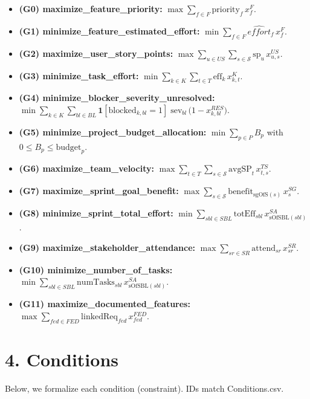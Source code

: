 \documentclass[11pt,a4paper]{article}
\begin{document}
\begin{itemize}
  \item \textbf{(G0) maximize\_feature\_priority:} \quad
  $\max \displaystyle \sum_{f \in F} \text{priority}_f \, x^{F}_{f}$.
  \item \textbf{(G1) minimize\_feature\_estimated\_effort:} \quad
  $\min \displaystyle \sum_{f \in F} \widehat{effort}_f \, x^{F}_{f}$.
  \item \textbf{(G2) maximize\_user\_story\_points:} \quad
  $\max \displaystyle \sum_{u \in US}\sum_{s \in \mathcal{S}} \text{sp}_u \, x^{US}_{u,s}$.
  \item \textbf{(G3) minimize\_task\_effort:} \quad
  $\min \displaystyle \sum_{k \in K}\sum_{t \in T} \text{eff}_k \, x^{K}_{k,t}$.
  \item \textbf{(G4) minimize\_blocker\_severity\_unresolved:} \quad
  $\min \displaystyle \sum_{k \in K}\sum_{bl \in BL} \mathbf{1}[\text{blocked}_{k,bl}{=}1] \; \text{sev}_{bl}\, \bigl(1 - x^{RES}_{k,bl}\bigr)$.
  \item \textbf{(G5) minimize\_project\_budget\_allocation:} \quad
  $\min \displaystyle \sum_{p \in P} B_p$ \quad with $0 \le B_p \le \text{budget}_p$.
  \item \textbf{(G6) maximize\_team\_velocity:} \quad
  $\max \displaystyle \sum_{t \in T}\sum_{s \in \mathcal{S}} \text{avgSP}_t \, x^{TS}_{t,s}$.
  \item \textbf{(G7) maximize\_sprint\_goal\_benefit:} \quad
  $\max \displaystyle \sum_{s \in \mathcal{S}} \text{benefit}_{\text{sgOfS}(s)} \, x^{SG}_{s}$.
  \item \textbf{(G8) minimize\_sprint\_total\_effort:} \quad
  $\min \displaystyle \sum_{sbl \in SBL} \text{totEff}_{sbl} \, x^{SA}_{\text{sOfSBL}(sbl)}$.
  \item \textbf{(G9) maximize\_stakeholder\_attendance:} \quad
  $\max \displaystyle \sum_{sr \in SR} \text{attend}_{sr} \, x^{SR}_{sr}$.
  \item \textbf{(G10) minimize\_number\_of\_tasks:} \quad
  $\min \displaystyle \sum_{sbl \in SBL} \text{numTasks}_{sbl} \, x^{SA}_{\text{sOfSBL}(sbl)}$.
  \item \textbf{(G11) maximize\_documented\_features:} \quad
  $\max \displaystyle \sum_{fed \in FED} \text{linkedReq}_{fed} \, x^{FED}_{fed}$.
\end{itemize}

\section{4. Conditions}
Below, we formalize each condition (constraint). IDs match Conditions.csv.
\end{document}
